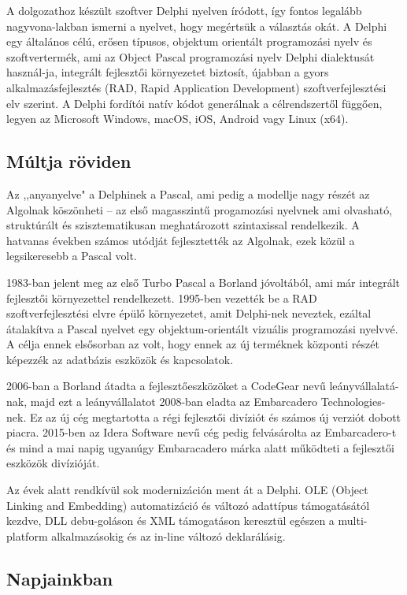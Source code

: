 
A dolgozathoz készült szoftver Delphi nyelven íródott, így fontos legalább nagyvona\hyp{}lakban ismerni a nyelvet, hogy megértsük a választás okát.
A Delphi egy általános célú, erősen típusos, objektum orientált programozási nyelv és szoftvertermék, ami az Object Pascal programozási nyelv Delphi dialektusát használ\hyp{}ja, integrált fejlesztői környezetet biztosít, újabban a gyors alkalmazásfejlesztés (RAD, Rapid Application Development) szoftverfejlesztési elv szerint. A Delphi fordítói natív kódot generálnak a célrendszertől függően, legyen az Microsoft Windows, macOS, iOS, Android vagy Linux (x64).\textit{\cite{delphi:001}}

\subsection{Múltja röviden}
Az ,,anyanyelve" a Delphinek a Pascal, ami pedig a modellje nagy részét az Algolnak köszönheti -- az első magasszintű progamozási nyelvnek ami olvasható, struktúrált és szisztematikusan meghatározott szintaxissal rendelkezik. A hatvanas években számos utódját fejlesztették az Algolnak, ezek közül a legsikeresebb a Pascal volt.

1983-ban jelent meg az első Turbo Pascal a Borland jóvoltából, ami már integrált fejlesztői környezettel rendelkezett. 1995-ben vezették be a RAD szoftverfejlesztési elvre épülő környezetet, amit Delphi-nek neveztek, ezáltal átalakítva a Pascal nyelvet egy objektum-orientált vizuális programozási nyelvvé. A célja ennek elsősorban az volt, hogy ennek az új terméknek központi részét képezzék az adatbázis eszközök és kapcsolatok.

2006-ban a Borland átadta a fejlesztőeszközöket a CodeGear nevű leányvállalatá\hyp{}nak, majd ezt a leányvállalatot 2008-ban eladta az Embarcadero Technologies-nek. Ez az új cég megtartotta a régi fejlesztői divíziót és számos új verziót dobott piacra. 2015-ben az Idera Software nevű cég pedig felvásárolta az Embarcadero-t és mind a mai napig ugyanúgy Embaracadero márka alatt működteti a fejlesztői eszközök divízióját.

Az évek alatt rendkívül sok modernizáción ment át a Delphi. OLE (Object Linking and Embedding) automatizáció és változó adattípus támogatásától kezdve, DLL debu\hyp{}goláson és XML támogatáson keresztül egészen a multi-platform alkalmazásokig és az in-line változó deklarálásig.\textit{\cite{delphi:002}}

\subsection{Napjainkban}

